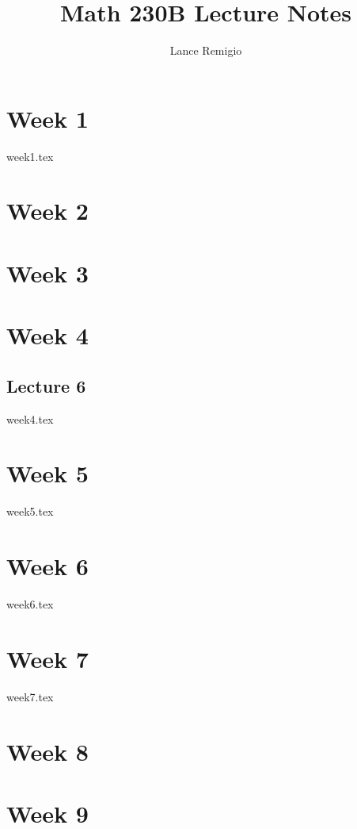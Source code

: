 \documentclass[a4paper]{book}
\title{Math 230B Lecture Notes}
\author{Lance Remigio}
\begin{document}
\maketitle

\chapter{Week 1}

{week1.tex}

\chapter{Week 2}


\chapter{Week 3}



\chapter{Week 4}

\section{Lecture 6}

{week4.tex}

\chapter{Week 5}

{week5.tex}

\chapter{Week 6}

{week6.tex}

\chapter{Week 7}

{week7.tex}

\chapter{Week 8}

\chapter{Week 9}
\end{document}
